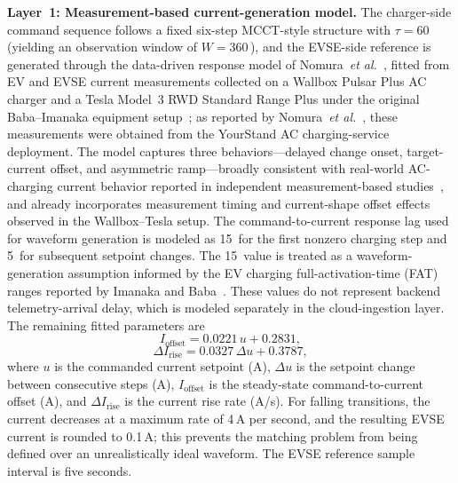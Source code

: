 \documentclass{ieeeaccess}
\begin{document}
    \textbf{Layer~1: Measurement-based current-generation model.}
    The charger-side command sequence follows a fixed six-step MCCT-style structure with $\tau = 60$\, (yielding an observation window of $W = 360$\,), and the EVSE-side reference is generated through the data-driven response model of Nomura~\textit{et al.}~\cite{b14}, fitted from EV and EVSE current measurements collected on a Wallbox Pulsar Plus AC charger and a Tesla Model~3 RWD Standard Range Plus under the original Baba--Imanaka equipment setup~\cite{b13}; as reported by Nomura~\textit{et al.}~\cite{b14}, these measurements were obtained from the YourStand AC charging-service deployment.
    The model captures three behaviors---delayed change onset, target-current offset, and asymmetric ramp---broadly consistent with real-world AC-charging current behavior reported in independent measurement-based studies~\cite{bferretti24}, and already incorporates measurement timing and current-shape offset effects observed in the Wallbox--Tesla setup.
    The command-to-current response lag used for waveform generation is modeled as 15\, for the first nonzero charging step and 5\, for subsequent setpoint changes.
    The 15\, value is treated as a waveform-generation assumption informed by the EV charging full-activation-time (FAT) ranges reported by Imanaka and Baba~\cite{bimanaka25}.
    These values do not represent backend telemetry-arrival delay, which is modeled separately in the cloud-ingestion layer.
    The remaining fitted parameters are
    \begin{equation}\label{eq:e14}
        I_{\text{offset}} = 0.0221\,u + 0.2831,
    \end{equation}
    \begin{equation}\label{eq:e15}
        \Delta I_{\text{rise}} = 0.0327\,\Delta u + 0.3787,
    \end{equation}
    where $u$ is the commanded current setpoint (A), $\Delta u$ is the setpoint change between consecutive steps (A), $I_{\text{offset}}$ is the steady-state command-to-current offset (A), and $\Delta I_{\text{rise}}$ is the current rise rate (A/s).
    For falling transitions, the current decreases at a maximum rate of 4\,A per second, and the resulting EVSE current is rounded to 0.1\,A; this prevents the matching problem from being defined over an unrealistically ideal waveform.
    The EVSE reference sample interval is five seconds.
\end{document}
